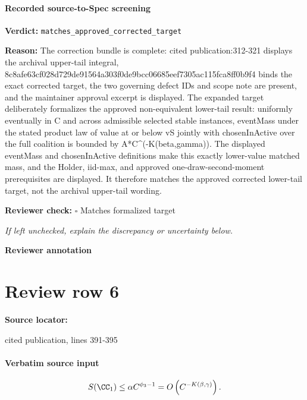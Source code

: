 \documentclass[10pt]{article}
\newcommand{\reviewerbox}{%
  \par\noindent\fbox{\parbox{0.96\linewidth}{\rule{0pt}{0.38in}}}\par
}
\newcommand{\reviewmatch}[1]{%
  \par\noindent\textbf{Reviewer check:} $\square$\; #1\par
  \noindent\emph{If left unchecked, explain the discrepancy or uncertainty below.}\par
}
\begin{document}
\paragraph{Recorded source-to-Spec screening}
\textbf{Verdict:} \texttt{matches\_approved\_corrected\_target}
\\
{\raggedright
\textbf{Reason:} The correction bundle is complete:\allowbreak{} cited publication:\allowbreak{}312-\allowbreak{}321 displays the archival upper-\allowbreak{}tail integral, 8c8afe63cf028d729de91564a303f0de9bcc06685eef7305ac115fca8ff0b9f4 binds the exact corrected target, the two governing defect IDs and scope note are present, and the maintainer approval excerpt is displayed.\allowbreak{} The expanded target deliberately formalizes the approved non-\allowbreak{}equivalent lower-\allowbreak{}tail result:\allowbreak{} uniformly eventually in C and across admissible selected stable instances, eventMass under the stated product law of value at or below vS jointly with chosenInActive over the full coalition is bounded by A*C\textasciicircum{}(-\allowbreak{}K(beta,gamma)).\allowbreak{} The displayed eventMass and chosenInActive definitions make this exactly lower-\allowbreak{}value matched mass, and the Holder, iid-\allowbreak{}max, and approved one-\allowbreak{}draw-\allowbreak{}second-\allowbreak{}moment prerequisites are displayed.\allowbreak{} It therefore matches the approved corrected lower-\allowbreak{}tail target, not the archival upper-\allowbreak{}tail wording.\allowbreak{}
\par}
\reviewmatch{Matches formalized target}
\noindent\textbf{Reviewer annotation}\par
\reviewerbox
\clearpage
\hypertarget{source-claim-baab78c419a8d66e}{}
\section*{Review row 6}
\textbf{Source locator:} {\footnotesize\raggedright cited publication, lines 391-\allowbreak{}395\par}
\paragraph{Verbatim source input}
\begin{ReviewVerbatim}
\begin{proposition}\label{prop:duck-1}
\begin{equation}
    S(\CC_1) \le \alpha C^{\phi_3 - 1} = O\left(C^{-K(\beta,\gamma)}\right).
\end{equation}
\end{proposition}
\end{ReviewVerbatim}
\end{document}
